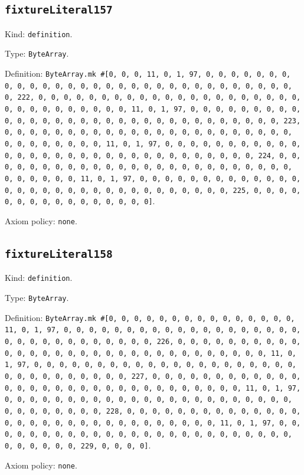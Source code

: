 \documentclass[11pt]{article}
\begin{document}
\subsection*{\texttt{fixtureLiteral157}}
\noindent Kind: \texttt{definition}.\par
\noindent Type: \texttt{ByteArray}.\par
\noindent Definition: \texttt{ByteArray.mk \#[0, 0, 0, 11, 0, 1, 97, 0, 0, 0, 0, 0, 0, 0, 0, 0, 0, 0, 0, 0, 0, 0, 0, 0, 0, 0, 0, 0, 0, 0, 0, 0, 0, 0, 0, 0, 0, 0, 222, 0, 0, 0, 0, 0, 0, 0, 0, 0, 0, 0, 0, 0, 0, 0, 0, 0, 0, 0, 0, 0, 0, 0, 0, 0, 0, 0, 0, 0, 0, 0, 11, 0, 1, 97, 0, 0, 0, 0, 0, 0, 0, 0, 0, 0, 0, 0, 0, 0, 0, 0, 0, 0, 0, 0, 0, 0, 0, 0, 0, 0, 0, 0, 0, 0, 0, 223, 0, 0, 0, 0, 0, 0, 0, 0, 0, 0, 0, 0, 0, 0, 0, 0, 0, 0, 0, 0, 0, 0, 0, 0, 0, 0, 0, 0, 0, 0, 0, 11, 0, 1, 97, 0, 0, 0, 0, 0, 0, 0, 0, 0, 0, 0, 0, 0, 0, 0, 0, 0, 0, 0, 0, 0, 0, 0, 0, 0, 0, 0, 0, 0, 0, 0, 224, 0, 0, 0, 0, 0, 0, 0, 0, 0, 0, 0, 0, 0, 0, 0, 0, 0, 0, 0, 0, 0, 0, 0, 0, 0, 0, 0, 0, 0, 0, 0, 11, 0, 1, 97, 0, 0, 0, 0, 0, 0, 0, 0, 0, 0, 0, 0, 0, 0, 0, 0, 0, 0, 0, 0, 0, 0, 0, 0, 0, 0, 0, 0, 0, 0, 0, 225, 0, 0, 0, 0, 0, 0, 0, 0, 0, 0, 0, 0, 0, 0, 0, 0]}.\par
\noindent Axiom policy: \texttt{none}.\par
\subsection*{\texttt{fixtureLiteral158}}
\noindent Kind: \texttt{definition}.\par
\noindent Type: \texttt{ByteArray}.\par
\noindent Definition: \texttt{ByteArray.mk \#[0, 0, 0, 0, 0, 0, 0, 0, 0, 0, 0, 0, 0, 0, 0, 11, 0, 1, 97, 0, 0, 0, 0, 0, 0, 0, 0, 0, 0, 0, 0, 0, 0, 0, 0, 0, 0, 0, 0, 0, 0, 0, 0, 0, 0, 0, 0, 0, 0, 0, 226, 0, 0, 0, 0, 0, 0, 0, 0, 0, 0, 0, 0, 0, 0, 0, 0, 0, 0, 0, 0, 0, 0, 0, 0, 0, 0, 0, 0, 0, 0, 0, 11, 0, 1, 97, 0, 0, 0, 0, 0, 0, 0, 0, 0, 0, 0, 0, 0, 0, 0, 0, 0, 0, 0, 0, 0, 0, 0, 0, 0, 0, 0, 0, 0, 0, 0, 227, 0, 0, 0, 0, 0, 0, 0, 0, 0, 0, 0, 0, 0, 0, 0, 0, 0, 0, 0, 0, 0, 0, 0, 0, 0, 0, 0, 0, 0, 0, 0, 11, 0, 1, 97, 0, 0, 0, 0, 0, 0, 0, 0, 0, 0, 0, 0, 0, 0, 0, 0, 0, 0, 0, 0, 0, 0, 0, 0, 0, 0, 0, 0, 0, 0, 0, 228, 0, 0, 0, 0, 0, 0, 0, 0, 0, 0, 0, 0, 0, 0, 0, 0, 0, 0, 0, 0, 0, 0, 0, 0, 0, 0, 0, 0, 0, 0, 0, 11, 0, 1, 97, 0, 0, 0, 0, 0, 0, 0, 0, 0, 0, 0, 0, 0, 0, 0, 0, 0, 0, 0, 0, 0, 0, 0, 0, 0, 0, 0, 0, 0, 0, 0, 229, 0, 0, 0, 0]}.\par
\noindent Axiom policy: \texttt{none}.\par
\end{document}
